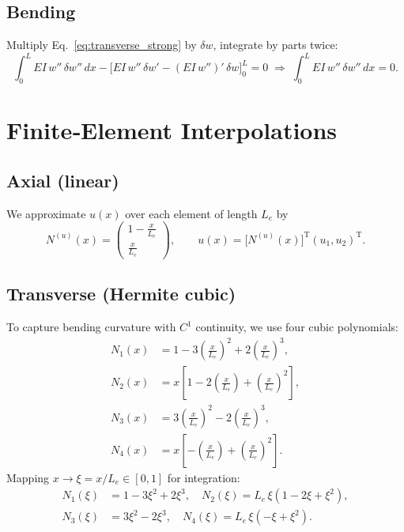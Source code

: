 \documentclass{article}
\begin{document}
	\subsection{Bending}
	Multiply Eq.~\eqref{eq:transverse_strong} by \(\delta w\), integrate by parts twice:
	\begin{equation}\label{eq:bending_weak}
		\int_0^L EI\,w''\,\delta w''\,dx 
		- \bigl[EI\,w''\,\delta w' - (EI\,w'')'\,\delta w\bigr]_0^L = 0
		\;\Longrightarrow\;
		\int_0^L EI\,w''\,\delta w''\,dx = 0.
	\end{equation}
	
	\section{Finite‐Element Interpolations}
	\subsection{Axial (linear)}
	We approximate \(u(x)\) over each element of length \(L_e\) by
	\begin{equation}\label{eq:axial_interp}
		N^{(u)}(x)
		= \begin{pmatrix}1-\tfrac{x}{L_e}\\[4pt]\tfrac{x}{L_e}\end{pmatrix},
		\qquad
		u(x)=\bigl[N^{(u)}(x)\bigr]^\text{T}(u_1,u_2)^\text{T}.
	\end{equation}
	
	\subsection{Transverse (Hermite cubic)}
	To capture bending curvature with \(C^1\) continuity, we use four cubic polynomials: 
	\begin{equation}\label{eq:cubic_interp}
		\begin{aligned}
			N_1(x)&=1-3(\tfrac{x}{L_e})^2+2(\tfrac{x}{L_e})^3,\\
			N_2(x)&=x[1-2(\tfrac{x}{L_e})+(\tfrac{x}{L_e})^2],\\
			N_3(x)&=3(\tfrac{x}{L_e})^2-2(\tfrac{x}{L_e})^3,\\
			N_4(x)&=x[-(\tfrac{x}{L_e})+(\tfrac{x}{L_e})^2].
		\end{aligned}
	\end{equation}
	Mapping \(x\to\xi=x/L_e\in[0,1]\) for integration:
	\begin{equation}\label{eq:map_interp}
		\begin{aligned}
			N_1(\xi)&=1-3\xi^2+2\xi^3,\quad
			N_2(\xi)=L_e\,\xi(1-2\xi+\xi^2),\\
			N_3(\xi)&=3\xi^2-2\xi^3,\quad
			N_4(\xi)=L_e\,\xi(-\xi+\xi^2).
		\end{aligned}
	\end{equation}
	
\end{document}
